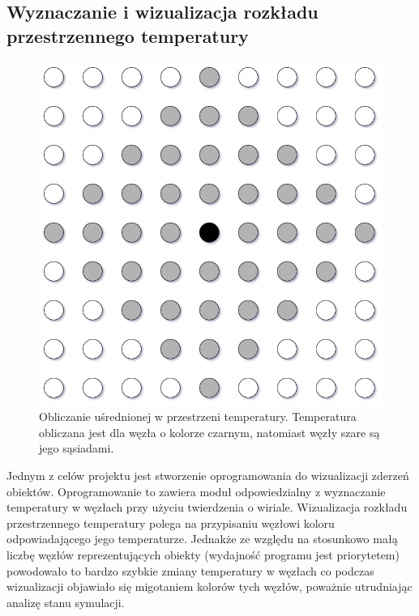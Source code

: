 \documentclass[12pt, letterpaper]{report}
\begin{document}
    \clearpage
    \subsection{Wyznaczanie i wizualizacja rozkładu przestrzennego temperatury}
    \begin{figure}
        \includegraphics[width=0.95\linewidth]{avg.drawio}
        \caption{
            Obliczanie uśrednionej w przestrzeni temperatury.
            Temperatura obliczana jest dla węzła o kolorze czarnym, 
            natomiast węzły szare są jego sąsiadami.
        }
    \end{figure}

    Jednym z celów projektu jest stworzenie oprogramowania do wizualizacji zderzeń obiektów.
    Oprogramowanie to zawiera moduł odpowiedzialny z wyznaczanie temperatury w węzłach 
    przy użyciu twierdzenia o wiriale. Wizualizacja rozkładu przestrzennego temperatury polega 
    na przypisaniu węzłowi koloru odpowiadającego jego temperaturze. Jednakże ze względu na 
    stosunkowo małą liczbę węzłów reprezentujących obiekty (wydajność programu jest priorytetem) 
    powodowało to bardzo szybkie zmiany temperatury w węzłach co podczas wizualizacji 
    objawiało się migotaniem kolorów tych węzłów, poważnie utrudniając analizę stanu symulacji. \\
\end{document}
